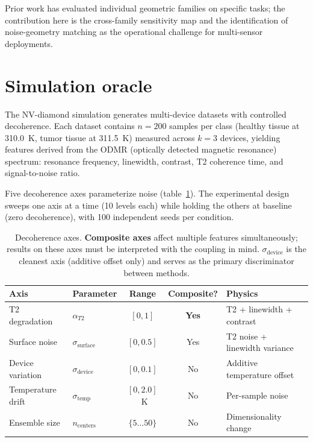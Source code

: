 \documentclass[11pt]{article}
\begin{document}
Prior work has evaluated individual geometric families on specific
tasks; the contribution here is the cross-family sensitivity map and
the identification of noise-geometry matching as the operational
challenge for multi-sensor deployments.

\section{Simulation oracle}
\label{sec:oracle}

The NV-diamond simulation generates multi-device datasets with controlled
decoherence.  Each dataset contains $n = 200$ samples per class (healthy
tissue at 310.0~K, tumor tissue at 311.5~K) measured across $k = 3$
devices, yielding features derived from the ODMR (optically detected
magnetic resonance) spectrum: resonance frequency, linewidth, contrast,
T2 coherence time, and signal-to-noise ratio.

Five decoherence axes parameterize noise (table~\ref{tab:axes}).  The
experimental design sweeps one axis at a time (10 levels each) while
holding the others at baseline (zero decoherence), with 100 independent
seeds per condition.

\begin{table}[t]
\centering
\caption{Decoherence axes.  \textbf{Composite axes} affect multiple
  features simultaneously; results on these axes must be interpreted
  with the coupling in mind.  $\sigma_\text{device}$ is the cleanest axis
  (additive offset only) and serves as the primary discriminator
  between methods.}
\label{tab:axes}
\begin{tabular}{@{}llccl@{}}
\toprule
Axis & Parameter & Range & Composite? & Physics \\
\midrule
T2 degradation & $\alpha_{T2}$ & $[0, 1]$ & \textbf{Yes} & T2 + linewidth + contrast \\
Surface noise & $\sigma_\text{surface}$ & $[0, 0.5]$ & Yes & T2 noise + linewidth variance \\
Device variation & $\sigma_\text{device}$ & $[0, 0.1]$ & No & Additive temperature offset \\
Temperature drift & $\sigma_\text{temp}$ & $[0, 2.0]$~K & No & Per-sample noise \\
Ensemble size & $n_\text{centers}$ & $\{5 \ldots 50\}$ & No & Dimensionality change \\
\bottomrule
\end{tabular}
\end{table}
\end{document}
